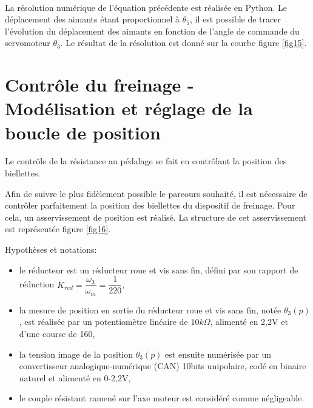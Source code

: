 
~\

La résolution numérique de l’équation précédente est réalisée en Python. Le déplacement des aimants étant proportionnel à $\theta_5$, il est possible de tracer l’évolution du déplacement des aimants en fonction de l’angle de commande du servomoteur $\theta_3$. Le résultat de la résolution est donné sur la courbe figure \ref{fig15}.



\section{Contrôle du freinage - Modélisation et réglage de la boucle de
position}

Le contrôle de la résistance au pédalage se fait en contrôlant la position des biellettes.


Afin de suivre le plus fidèlement possible le parcours souhaité, il est nécessaire de contrôler parfaitement la position des biellettes du dispositif de freinage. Pour cela, un asservissement de position est réalisé. La structure de cet asservissement est représentée figure \ref{fig16}.


Hypothèses et notations:
\begin{itemize}
 \item le réducteur est un réducteur roue et vis sans fin, défini par son rapport de réduction $K_{red}=\dfrac{\omega_3}{\omega_m}=\dfrac{1}{220}$,
 \item la mesure de position en sortie du réducteur roue et vis sans fin, notée $\theta_3(p)$, est réalisée par un potentiomètre linéaire de $10k\Omega$, alimenté en 2,2V et d’une course de 160\textdegree,
 \item la tension image de la position $\theta_3(p)$ est ensuite numérisée par un convertisseur analogique-numérique (CAN) 10bits unipolaire, codé en binaire naturel et alimenté en 0-2,2V,
 \item le couple résistant ramené sur l’axe moteur est considéré comme négligeable.
\end{itemize}

